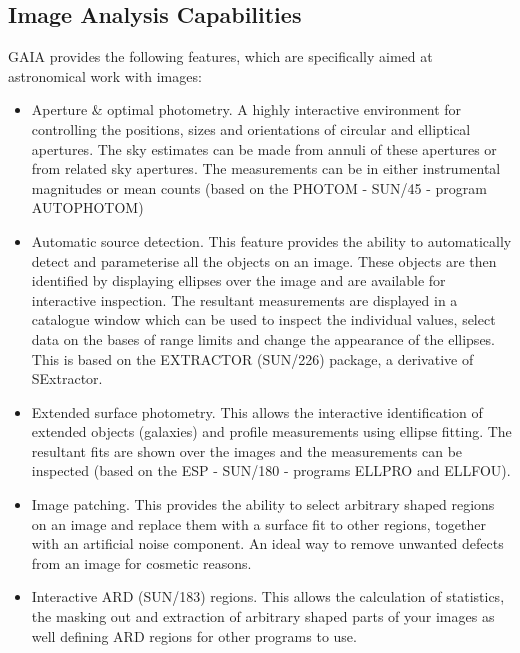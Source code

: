 \documentclass[twoside,11pt]{article}
\newcommand{\xref}[3]{#1}
\newcommand{\xlabel}[1]{}
\renewcommand{\_}{\texttt{\symbol{95}}}
\begin{document}
\subsection{\xlabel{image_analysis_capabilities}Image Analysis Capabilities}
GAIA provides the following features, which are specifically aimed at
astronomical work with images:
\begin{itemize}
\item Aperture \& optimal photometry. A highly interactive environment
  for controlling the positions, sizes and orientations of circular
  and elliptical apertures. The sky estimates can be made from
  annuli of these apertures or from related sky apertures. The
  measurements can be in either instrumental magnitudes or
  mean counts (based on the PHOTOM - \xref{SUN/45}{sun45}{} -
  program \xref{AUTOPHOTOM}{sun45}{AUTOPHOTOM})

\item Automatic source detection. This feature provides the ability to
  automatically detect and parameterise all the objects on an
  image. These objects are then identified by displaying ellipses over
  the image and are available for interactive inspection. The resultant
  measurements are displayed in a catalogue window which can be used to
  inspect the individual values, select data on the bases of range
  limits and change the appearance of the ellipses. This is based on the
  EXTRACTOR (\xref{SUN/226}{sun226}{}) package, a derivative of
  SExtractor.

\item Extended surface photometry. This allows the interactive 
  identification of extended objects (galaxies) and profile
  measurements using ellipse fitting. The resultant fits are shown
  over the images and the measurements can be inspected (based on the
  ESP - \xref{SUN/180}{sun180}{} - programs
  \xref{ELLPRO}{sun180}{ELLPRO} and \xref{ELLFOU}{sun180}{ELLFOU}).

\item Image patching. This provides the ability to select arbitrary
  shaped regions on an image and replace them with a surface fit
  to other regions, together with an artificial noise component.
  An ideal way to remove unwanted defects from an image for
  cosmetic reasons.

\item Interactive ARD (\xref{SUN/183}{sun183}{}) regions. This
  allows the calculation of statistics, the masking out and
  extraction of arbitrary shaped parts of your images as well
  defining ARD regions for other programs to use.


\end{itemize}
\end{document}
